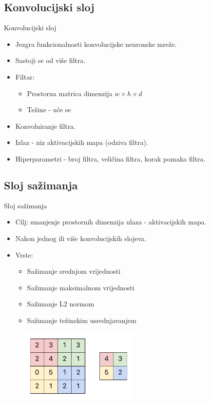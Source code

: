 \documentclass{beamer}
\begin{document}
\subsection{Konvolucijski sloj}
\begin{frame}{Konvolucijski sloj}
\begin{itemize}
  \item {
    Jezgra funkcionalnosti konvolucijske neuronske mreže.
    \pause
  }
  \item {
    Sastoji se od više filtra.
    \pause
  }
 \item {
    Filtar:
    \begin{itemize}
        \item Prostorna matrica dimenzija $w \times h \times d$
        \item Težine - uče se
    \end{itemize}
    \pause
  }
  \item {
    Konvoluiranje filtra.
    \pause
  }
  \item {
    Izlaz - niz aktivacijskih mapa (odziva filtra).
    \pause
  }
  \item {
  Hiperparametri - broj filtra, veličina filtra, korak pomaka filtra.
  }
\end{itemize}
\end{frame}

\subsection{Sloj sažimanja}
\begin{frame}{Sloj sažimanja}
\begin{itemize}
  \item {
    Cilj: smanjenje prostornih dimenzija ulaza - aktivacijskih mapa.
    \pause
  }
  \item {
    Nakon jednog ili više konvolucijskih slojeva.
    \pause
  }
 \item {
    Vrste:
    \begin{itemize}
        \item Sažimanje srednjom vrijednosti
        \item Sažimanje maksimalnom vrijednosti
        \item Sažimanje L2 normom
        \item Sažimanje težinskim usrednjavanjem
    \end{itemize}
  }
\end{itemize}
  \begin{figure}[htb]
    \centering
    \includegraphics[width=6cm]{pool_example.pdf}
    \end{figure}
\end{frame}
\end{document}
